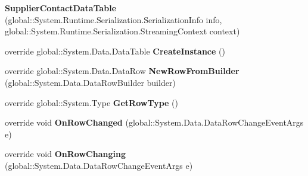 \begin{DoxyCompactItemize}
\item 
{\bfseries Supplier\+Contact\+Data\+Table} (global\+::\+System.\+Runtime.\+Serialization.\+Serialization\+Info info, global\+::\+System.\+Runtime.\+Serialization.\+Streaming\+Context context)\hypertarget{class_products_1_1_data_1_1ds_sage_1_1_supplier_contact_data_table_a2849a0774986555bdbf16c925dacc747}{}\label{class_products_1_1_data_1_1ds_sage_1_1_supplier_contact_data_table_a2849a0774986555bdbf16c925dacc747}

\item 
override global\+::\+System.\+Data.\+Data\+Table {\bfseries Create\+Instance} ()\hypertarget{class_products_1_1_data_1_1ds_sage_1_1_supplier_contact_data_table_a55b68a161e6af3d274248c512f205026}{}\label{class_products_1_1_data_1_1ds_sage_1_1_supplier_contact_data_table_a55b68a161e6af3d274248c512f205026}

\item 
override global\+::\+System.\+Data.\+Data\+Row {\bfseries New\+Row\+From\+Builder} (global\+::\+System.\+Data.\+Data\+Row\+Builder builder)\hypertarget{class_products_1_1_data_1_1ds_sage_1_1_supplier_contact_data_table_a53d1e28fb308a8eb16f5d5577821e54f}{}\label{class_products_1_1_data_1_1ds_sage_1_1_supplier_contact_data_table_a53d1e28fb308a8eb16f5d5577821e54f}

\item 
override global\+::\+System.\+Type {\bfseries Get\+Row\+Type} ()\hypertarget{class_products_1_1_data_1_1ds_sage_1_1_supplier_contact_data_table_a53ba964109cfd2f178f0440d4b857b07}{}\label{class_products_1_1_data_1_1ds_sage_1_1_supplier_contact_data_table_a53ba964109cfd2f178f0440d4b857b07}

\item 
override void {\bfseries On\+Row\+Changed} (global\+::\+System.\+Data.\+Data\+Row\+Change\+Event\+Args e)\hypertarget{class_products_1_1_data_1_1ds_sage_1_1_supplier_contact_data_table_add15b3aa6dce8dff8cb007cdbd10a866}{}\label{class_products_1_1_data_1_1ds_sage_1_1_supplier_contact_data_table_add15b3aa6dce8dff8cb007cdbd10a866}

\item 
override void {\bfseries On\+Row\+Changing} (global\+::\+System.\+Data.\+Data\+Row\+Change\+Event\+Args e)\hypertarget{class_products_1_1_data_1_1ds_sage_1_1_supplier_contact_data_table_ac471d0f1fa6093fbc063cb6f2a401343}{}\label{class_products_1_1_data_1_1ds_sage_1_1_supplier_contact_data_table_ac471d0f1fa6093fbc063cb6f2a401343}


\end{DoxyCompactItemize}
